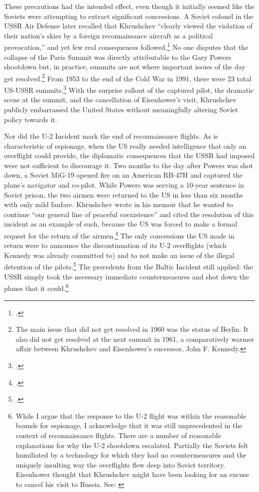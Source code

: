 \documentclass[14pt]{extarticle}
\begin{document}
These precautions had the intended effect, even though it initially seemed like the Soviets were attempting to extract significant concessions. A Soviet colonel in the USSR Air Defense later recalled that Khrushchev ``clearly viewed the violation of their nation's skies by a foreign reconnaissance aircraft \textelp{} as a political provocation,'' and yet few real consequences followed.\footcite{orlov_u-2_2007} No one disputes that the collapse of the Paris Summit was directly attributable to the Gary Powers shootdown but, in practice, summits are not where important issues of the day get resolved.\footnote{The main issue that did not get resolved in 1960 was the status of Berlin. It also did not get resolved at the next summit in 1961, a comparatively warmer affair between Khrushchev and Eisenhower's successor, John F. Kennedy.} From 1953 to the end of the Cold War in 1991, there were 23 total US-USSR summits.\footcite{fain_chronology_2011} With the surprise rollout of the captured pilot, the dramatic scene at the summit, and the cancellation of Eisenhower's visit, Khrushchev publicly embarrassed the United States without meaningfully altering Soviet policy towards it.

Nor did the U-2 Incident mark the end of reconnaissance flights. As is characteristic of espionage, when the US really needed intelligence that only an overflight could provide, the diplomatic consequences that the USSR had imposed were not sufficient to discourage it. Two months to the day after Powers was shot down, a Soviet MiG-19 opened fire on an American RB-47H and captured the plane's navigator and co-pilot. While Powers was serving a 10-year sentence in Soviet prison, the two airmen were returned to the US in less than six months with only mild fanfare. Khrushchev wrote in his memoir that he wanted to continue \enquote{our general line of peaceful coexistence} and cited the resolution of this incident as an example of such, because the US was forced to make a formal request for the return of the airmen.\footcite[p.~256-257]{khrushchev_memoirs_2007} The only concessions the US made in return were to announce the discontinuation of its U-2 overflights (which Kennedy was already committed to) and to not make an issue of the illegal detention of the pilots.\footcite{time_cold_1961} The precedents from the Baltic Incident still applied: the USSR simply took the necessary immediate countermeasures and shot down the planes that it could.\footnote{While I argue that the response to the U-2 flight was within the reasonable bounds for espionage, I acknowledge that it was still unprecedented in the context of reconnaissance flights. There are a number of reasonable explanations for why the U-2 shootdown escalated. Partially the Soviets felt humiliated by a technology for which they had no countermeasures and the uniquely insulting way the overflights flew deep into Soviet territory. Eisenhower thought that Khrushchev might have been looking for an excuse to cancel his visit to Russia. See: \cite[p.~555]{eisenhower_waging_1965}}
\end{document}
